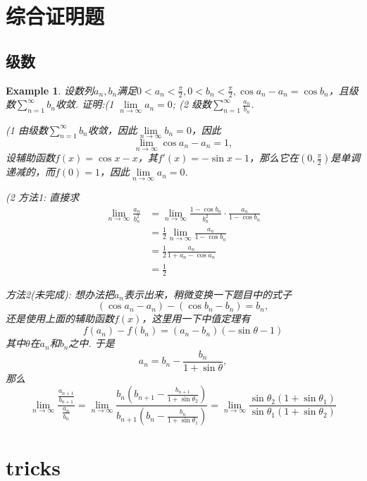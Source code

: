 \documentclass{article}
\newtheorem{example}[theorem]{Example}
\newcommand{\hints}{{\color{blue} \text{hints}}}
\begin{document}
\section{综合证明题}

\subsection{级数}

\begin{example}
\rm 设数列${a_n},{b_n}$满足$0 < a_n < \frac{\pi}{2}, 0 < b_n < \frac{\pi}{2}, \cos a_n - a_n = \cos b_n$，且级数$\sum\limits_{n=1}^{\infty}b_n$收敛. 证明:(1 $\lim\limits_{n \to \infty} a_n = 0$; (2 级数$\sum\limits_{n=1}^{\infty} \frac{a_n}{b_n}$. 

\hints (1 由级数$\sum\limits_{n=1}^{\infty}b_n$收敛，因此$\lim\limits_{n \to \infty} b_n = 0$，因此
$$
\lim\limits_{n \to \infty} \cos a_n-a_n = 1,
$$
设辅助函数$f(x) = \cos x-x$，其$f'(x) = -\sin x - 1$，那么它在$(0,\frac{\pi}{2})$是单调递减的，而$f(0) = 1$，因此$\lim\limits_{n \to \infty} a_n = 0$. 

(2 方法1: 直接求
$$
\begin{aligned}
\lim\limits_{n \to \infty} \frac{a_n}{b_n^2} &= \lim\limits_{n \to \infty} \frac{1-\cos b_n}{b_n^2} \cdot \frac{a_n}{1-\cos b_n} \\
&= \frac{1}{2} \lim\limits_{n \to \infty}  \frac{a_n}{1-\cos b_n} \\
&= \frac{1}{2} \frac{a_n}{1+a_n - \cos a_n} \\
&= \frac{1}{2}
\end{aligned}
$$


方法2(未完成): 想办法把$a_n$表示出来，稍微变换一下题目中的式子
$$
(\cos a_n-a_n) -(\cos b_n-b_n) = b_n, 
$$
还是使用上面的辅助函数$f(x)$，这里用一下中值定理有
$$
f(a_n)-f(b_n)=(a_n-b_n)(-\sin \theta - 1)
$$
其中$\theta$在$a_n$和$b_n$之中. 于是
$$
a_n = b_n - \frac{b_n}{1+\sin \theta},
$$
那么
$$
\lim\limits_{n \to \infty} \frac{\frac{a_{n+1}}{b_{n+1}}}{\frac{a_{n}}{b_{n}}} = \lim\limits_{n \to \infty} \frac{b_n(b_{n+1} - \frac{b_{n+1}}{1+\sin \theta_2})}{b_{n+1}(b_{n} - \frac{b_{n}}{1+\sin \theta_1})} = \lim\limits_{n \to \infty} \frac{\sin \theta_2(1+\sin\theta_1)}{\sin \theta_1(1+\sin\theta_2)}
$$
\end{example}

\newpage
\section{tricks}
\end{document}
